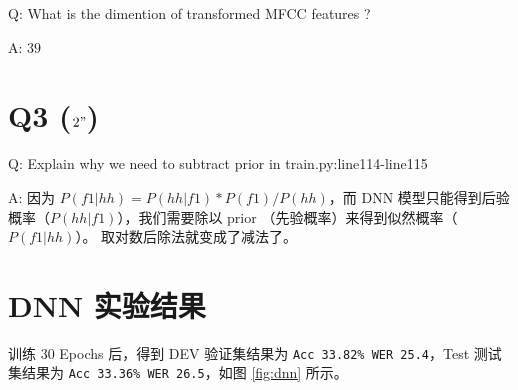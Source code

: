 \documentclass[degree=project,degree-type=project,cjk-font=noto]{thuthesis}
\begin{document}
Q: What is the dimention of transformed MFCC features ?

A: $39$

\section{Q3 ($2"$)}

Q: Explain why we need to subtract prior in train.py:line114-line115

A: 因为 $P(f1 | hh) = P(hh | f1) * P(f1) / P(hh)$，而 DNN 模型只能得到后验概率（$P(hh | f1)$），我们需要除以 prior （先验概率）来得到似然概率（$P(f1 | hh)$）。
取对数后除法就变成了减法了。

\section{DNN 实验结果}

训练 30 Epochs 后，得到 DEV 验证集结果为 \texttt{Acc 33.82\% WER 25.4}，Test 测试集结果为 \texttt{Acc 33.36\% WER 26.5}，如图 \ref{fig:dnn} 所示。

\backmatter


\appendix
\end{document}
